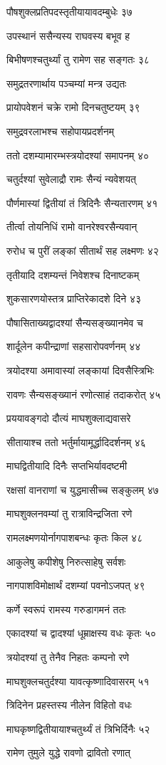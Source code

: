 पौषशुक्लप्रतिपदस्तृतीयायावदम्बुधेः ३७

उपस्थानं ससैन्यस्य राघवस्य बभूव ह

बिभीषणश्चतुर्थ्यां तु रामेण सह सङ्गतः ३८

समुद्रतरणार्थाय पञ्चम्यां मन्त्र उद्यतः

प्रायोपवेशनं चक्रे रामो दिनचतुष्टयम् ३९

समुद्रवरलाभश्च सहोपायप्रदर्शनम्

ततो दशम्यामारम्भस्त्रयोदश्यां समापनम् ४०

चतुर्दश्यां सुवेलाद्रौ रामः सैन्यं न्यवेशयत्

पौर्णमास्यां द्वितीयां तं त्रिदिनैः सैन्यतारणम् ४१

तीर्त्वा तोयनिधिं रामो वानरेश्वरसैन्यवान्

रुरोध च पुरीं लङ्कां सीतार्थं सह लक्ष्मणः ४२

तृतीयादि दशम्यन्तं निवेशश्च दिनाष्टकम्

शुकसारणयोस्तत्र प्राप्तिरेकादशे दिने ४३

पौषासिताख्यद्वादश्यां सैन्यसङ्ख्यानमेव च

शार्दूलेन कपीन्द्राणां सहसारोपवर्णनम् ४४

त्रयोदश्या अमावास्यां लङ्कायां दिवसैस्त्रिभिः

रावणः सैन्यसङ्ख्यानं रणोत्साहं तदाकरोत् ४५

प्रययावङ्गदो दौत्यं माघशुक्लाद्यवासरे

सीतायाश्च ततो भर्तुर्मायामूर्द्धादिदर्शनम् ४६

माघद्वितीयादि दिनैः सप्तभिर्यावदष्टमी

रक्षसां वानराणां च युद्धमासीच्च सङ्कुलम् ४७

माघशुक्लनवम्यां तु रात्राविन्द्रजिता रणे

रामलक्ष्मणयोर्नागपाशबन्धः कृतः किल ४८

आकुलेषु कपीशेषु निरुत्साहेषु सर्वशः

नागपाशविमोक्षार्थं दशम्यां पवनोऽजपत् ४९

कर्णे स्वरूपं रामस्य गरुडागमनं ततः

एकादश्यां च द्वादश्यां धूम्राक्षस्य वधः कृतः ५०

त्रयोदश्यां तु तेनैव निहतः कम्पनो रणे

माघशुक्लचतुर्दश्या यावत्कृष्णादिवासरम् ५१

त्रिदिनेन प्रहस्तस्य नीलेन विहितो वधः

माघकृष्णद्वितीयायाश्चतुर्थ्यं तं त्रिभिर्दिनैः ५२

रामेण तुमुले युद्धे रावणो द्रावितो रणात्

